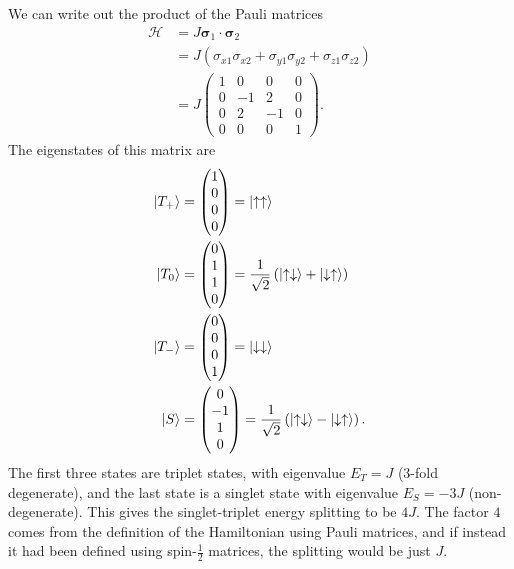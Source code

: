\documentclass{article}
\begin{document}
We can write out the product of the Pauli matrices
\begin{align*}
    \mathcal{H} &= J\mathbf{\sigma }_1\cdot\mathbf{\sigma }_2\\
                &= J \left( \sigma _{x1}\sigma _{x2}+\sigma _{y1}\sigma _{y 2}+\sigma _{z1}\sigma _{z 2} \right)\\
                &= J\begin{pmatrix}
                    1&0&0&0\\
                    0&-1&2&0\\
                    0&2&-1&0\\
                    0&0&0&1
                \end{pmatrix}.
\end{align*}
The eigenstates of this matrix are
\begin{align*}
    \ket{T_+} &=\begin{pmatrix}
        1\\0\\0\\0
    \end{pmatrix}=\ket{\uparrow \uparrow}\\
        \ket{T_0} &=\begin{pmatrix}
            0\\1\\1\\0
        \end{pmatrix}= \frac{1}{\sqrt{2}}\left( \ket{\uparrow \downarrow}+\ket{\downarrow \uparrow} \right) \\
            \ket{T_-}&=\begin{pmatrix}
            0\\0\\0\\1
        \end{pmatrix}=\ket{\downarrow \downarrow}\\
            \ket{S}&=\begin{pmatrix}
            0\\-1\\1\\0
        \end{pmatrix}=\frac{1}{\sqrt{2}}\left( \ket{\uparrow \downarrow}-\ket{\downarrow \uparrow} \right).
\end{align*}
The first three states are triplet states, with eigenvalue $E_T=J$ (3-fold degenerate), and the last state is a singlet state with eigenvalue $E_S=-3J$ (non-degenerate). This gives the singlet-triplet energy splitting to be $4J$. The factor $4$ comes from the definition of the Hamiltonian using Pauli matrices, and if instead it had been defined using spin-$\frac{1}{2}$ matrices, the splitting would be just $J$.
\end{document}
